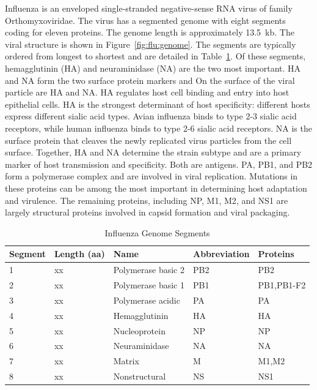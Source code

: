 Influenza is an enveloped single-stranded negative-sense RNA virus of family Orthomyxoviridae.
The virus has a segmented genome with eight segments coding for eleven proteins.
The genome length is approximately 13.5~kb.
The viral structure is shown in Figure~\ref{fig:flu:genome}.
The segments are typically ordered from longest to shortest and are detailed in Table~\ref{table:influenza_genome_segments}.
Of these segments, hemagglutinin (HA) and neuraminidase (NA) are the two most important.
HA and NA form the two surface protein markers and 
On the surface of the viral particle are HA and NA.
HA regulates host cell binding and entry into host epithelial cells.
HA is the strongest determinant of host specificity: different hosts express different sialic acid types.
Avian influenza binds to type 2-3 sialic acid receptors, while human influenza binds to type 2-6 sialic acid receptors.
NA is the surface protein that cleaves the newly replicated virus particles from the cell surface.
Together, HA and NA determine the strain subtype and are a primary marker of host transmission and specificity.
Both are antigens.
PA, PB1, and PB2 form a polymerase complex and are involved in viral replication.
Mutations in these proteins can be among the most important in determining host adaptation and virulence.
The remaining proteins, including NP, M1, M2, and NS1 are largely structural proteins involved in capsid formation and viral packaging.

\begin{table}
\centering
\caption{Influenza Genome Segments}
\small
{}
\setlength{\aboverulesep}{0pt}
\setlength{\belowrulesep}{0pt}
\setlength{\extrarowheight}{.75ex}
\begin{tabularx}{\textwidth}{XXXXX}
\toprule\rowcolor{gray!50}
Segment & Length (aa) & Name & Abbreviation & Proteins \\
\midrule
1 & xx & Polymerase basic 2 & PB2 & PB2 \\
2 & xx & Polymerase basic 1 & PB1 & PB1,PB1-F2 \\
3 & xx & Polymerase acidic & PA & PA \\
4 & xx & Hemagglutinin & HA & HA \\
5 & xx & Nucleoprotein & NP & NP \\
6 & xx & Neuraminidase & NA & NA \\
7 & xx & Matrix        & M  & M1,M2 \\
8 & xx & Nonstructural & NS & NS1 \\
\bottomrule
\end{tabularx}
\label{table:influenza_genome_segments}
\end{table}

